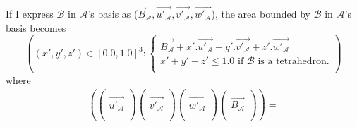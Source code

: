 \documentclass[12pt, a4paper]{article}
\begin{document}
If I express $\mathcal{B}$ in $\mathcal{A}$'s basis as ($\overrightarrow{B}_\mathcal{A}, \overrightarrow{u'_\mathcal{A}}, \overrightarrow{v'_\mathcal{A}}, \overrightarrow{w'_\mathcal{A}}$), the area bounded by $\mathcal{B}$ in $\mathcal{A}$'s basis becomes
\begin{equation}
\left((x', y', z')\in[0.0, 1.0]^3:\left\{
\begin{array}{l}
\overrightarrow{B_\mathcal{A}}+x'.\overrightarrow{u'_\mathcal{A}}+y'.\overrightarrow{v'_\mathcal{A}}+z'.\overrightarrow{w'_\mathcal{A}}\\
x'+y'+z'\le 1.0 \mbox{ if $\mathcal{B}$ is a tetrahedron.}\\
\end{array}
\right.\right)
\end{equation}
where
\begin{equation}
\begin{array}{l}
\left(\left(\begin{array}{l}\\\overrightarrow{u'_\mathcal{A}}\\\\\end{array}\right)\left(\begin{array}{l}\\\overrightarrow{v'_\mathcal{A}}\\\\\end{array}\right)\left(\begin{array}{l}\\\overrightarrow{w'_\mathcal{A}}\\\\\end{array}\right)\left(\begin{array}{l}\\\overrightarrow{B_\mathcal{A}}\\\\\end{array}\right)\right)=\\

\end{array}
\end{equation}
\end{document}
